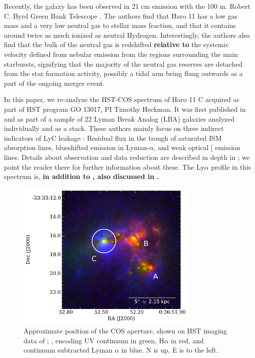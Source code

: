 \documentclass[twocolumn, trackchanges]{aastex61}
\begin{document}
Recently, the galaxy has been observed in 21 cm  emission with
the 100 m. Robert C. Byrd Green Bank Telescope \citep{Pardy2016arXiv}.
The authors find that Haro 11 has a low gas mass and a very low neutral
gas to stellar mass fraction, and that it contains around twice as much
ionized as neutral Hydrogen. Interestingly, the authors also find that
the bulk of the neutral gas is redshifted \textbf{relative to} the systemic 
velocity defined from nebular emission from the  regions surrounding
the main starbursts, signifying that the majority of the neutral gas
reserves are detached from the star formation activity, possibly a tidal
arm being flung outwards as a part of the ongoing merger event.

In this paper, we re-analyze the HST-COS spectrum of Haro 11 C acquired
as part of HST program GO 13017, PI Timothy Heckman. It was first
published in \citet{Alexandroff2015} and \citet{Heckman2015} as part of
a sample of 22 Lyman Break Analog (LBA) galaxies analyzed individually
and as a stack. These authors mainly focus on three indirect indicators
of LyC leakage \citep{Overzier2009, Heckman2011}: Residual flux in the
trough of saturated ISM absorption lines, blueshifted emission in
Lyman-$\alpha$, and weak optical {[}\ion{S}{2}{]} emission lines.
Details about observation and data reduction are described in depth in
\citet{Alexandroff2015}; we point the reader there for further
information about these. The Ly$\alpha$ profile in this spectrum is, \textbf{in
addition to \citet{Heckman2011}, also discussed in \citet{Verhamme2015}.}

\begin{figure}
\centering
\includegraphics[width=3.500in]{./Haroslit.pdf}
\caption{Approximate position of the COS aperture, shown on HST imaging
data of \citet{Hayes2009}; \citet{Ostlin2009}, encoding UV continuum in
green, H$\alpha$ in red, and continuum subtracted Lyman $\alpha$ in
blue. N is up, E is to the left.}\label{fig:apert}
\end{figure}
\end{document}
